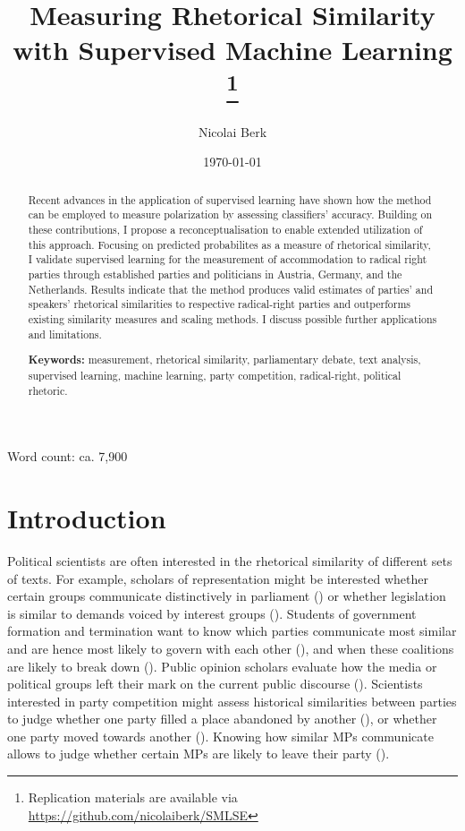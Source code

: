 \documentclass{article}
\title{Measuring Rhetorical Similarity with Supervised Machine Learning
\footnote{Replication materials are available via \href{https://github.com/nicolaiberk/SMLSE}{https://github.com/nicolaiberk/SMLSE}}
}
\author{Nicolai Berk}
\date{\today}
\begin{document}
\maketitle


\begin{abstract}
Recent advances in the application of supervised learning have shown how the method can be employed to measure polarization by assessing classifiers' accuracy. Building on these contributions, I propose a reconceptualisation to enable extended utilization of this approach. Focusing on predicted probabilites as a measure of rhetorical similarity, I validate supervised learning for the measurement of accommodation to radical right parties through established parties and politicians in Austria, Germany, and the Netherlands. Results indicate that the method produces valid estimates of parties' and speakers' rhetorical similarities to respective radical-right parties and outperforms existing similarity measures and scaling methods. I discuss possible further applications and limitations.\par \medskip


\textbf{Keywords:} measurement, rhetorical similarity, parliamentary debate, text analysis, supervised learning, machine learning, party competition, radical-right, political rhetoric.
\end{abstract}

\begin{center}
Word count: ca. 7,900
\end{center}

\section{Introduction}
\label{sec:Intro}
Political scientists are often interested in the rhetorical similarity of different sets of texts. For example, scholars of representation might be interested whether certain groups communicate distinctively in parliament (\cite{Pitkin1967}) or whether legislation is similar to demands voiced by interest groups (\cite{Gilens2014a}). Students of government formation and termination want to know which parties communicate most similar and are hence most likely to govern with each other (\cite{Gamson1961}), and when these coalitions are likely to break down (\cite{Lupia1995CoalitionTermination}). Public opinion scholars evaluate how the media or political groups left their mark on the current public discourse (\cite{Zaller1992}). Scientists interested in party competition might assess historical similarities between parties to judge whether one party filled a place abandoned by another (\cite{Kitschelt1986}), or whether one party moved towards another (\cite{Downs1957}). Knowing how similar MPs communicate allows to judge whether certain MPs are likely to leave their party (\cite{Hirschman1970}).\par
\end{document}
